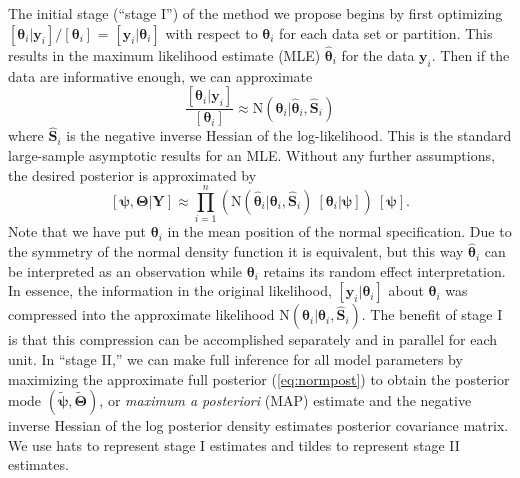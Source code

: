 \documentclass[12pt]{article}
\newcommand{\by}{\mathbf{y}}
\newcommand{\bt}{\boldsymbol{\theta}}
\newcommand{\bT}{\boldsymbol{\Theta}}
\newcommand{\bp}{\boldsymbol{\psi}}
\newcommand{\bS}{\mathbf{S}}
\newcommand{\bY}{\mathbf{Y}}
\begin{document}
The initial stage (``stage I'') of the method we propose begins by first optimizing $[\bt_i|\by_i]/[\bt_i]$ = $[\by_i|\bt_i]$ with respect to $\bt_i$ for each data set or partition. This results in the maximum likelihood estimate (MLE) $\hat{\bt}_i$ for the data $\by_i$. Then if the data are informative enough, we can approximate 
\[
\frac{[\bt_i|\by_i]}{[\bt_i]} \approx \text{N}(\bt_i|\hat{\bt}_i, \hat{\bS}_i)
\]
where $\hat{\bS}_i$ is the negative inverse Hessian of the log-likelihood. This is the standard large-sample asymptotic results for an MLE. Without any further assumptions, the desired posterior is approximated by
\begin{equation}
\label{eq:normpost}
[\bp,\bT|\bY] \approx  \prod_{i=1}^n\left(\text{N}(\hat{\bt}_i|\bt_i, \hat{\bS}_i)\ [\bt_i|\bp]\right)\ [\bp].
\end{equation}
Note that we have put $\bt_i$ in the mean position of the normal specification. Due to the symmetry of the normal density function it is equivalent, but this way $\hat{\bt}_i$ can be interpreted as an observation while $\bt_i$ retains its random effect interpretation. In essence, the information in the original likelihood, $[\by_i|\bt_i]$ about $\bt_i$ was compressed into the approximate likelihood $\text{N}(\hat{\bt}_i|\bt_i, \hat{\bS}_i)$. The benefit of stage I is that this compression can be accomplished separately and in parallel for each unit. In ``stage II,'' we can make full inference for all model parameters by maximizing the approximate full posterior (\ref{eq:normpost}) to obtain the posterior mode $(\tilde{\bp},\tilde{\bT})$, or {\it maximum a posteriori} (MAP) estimate and the negative inverse Hessian of the log posterior density estimates posterior covariance matrix. We use hats to represent stage I estimates and tildes to represent stage II estimates.
\end{document}
